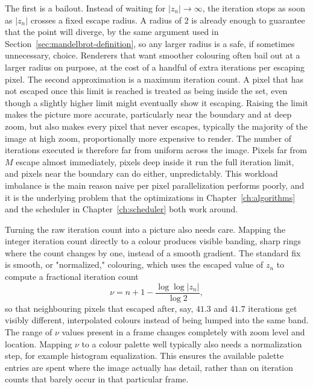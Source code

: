 \documentclass{ftndiplomski}
\begin{document}
The first is a bailout. Instead of waiting for $|z_n| \to \infty$, the iteration stops as soon as
$|z_n|$ crosses a fixed escape radius. A radius of $2$ is already enough to guarantee that the
point will diverge, by the same argument used in Section~\ref{sec:mandelbrot-definition}, so any
larger radius is a safe, if sometimes unnecessary, choice. Renderers that want smoother colouring
often bail out at a larger radius on purpose, at the cost of a handful of extra iterations per
escaping pixel. The second approximation is a maximum iteration count. A pixel that has not escaped
once this limit is reached is treated as being inside the set, even though a slightly higher limit
might eventually show it escaping. Raising the limit makes the picture more accurate, particularly
near the boundary and at deep zoom, but also makes every pixel that never escapes, typically the
majority of the image at high zoom, proportionally more expensive to render. The number of
iterations executed is therefore far from uniform across the image. Pixels far from $M$ escape
almost immediately, pixels deep inside it run the full iteration limit, and pixels near the
boundary can do either, unpredictably. This workload imbalance is the main reason naive per pixel
parallelization performs poorly, and it is the underlying problem that the optimizations in
Chapter~\ref{ch:algorithms} and the scheduler in Chapter~\ref{ch:scheduler} both work around.

Turning the raw iteration count into a picture also needs care. Mapping the integer iteration count
directly to a colour produces visible banding, sharp rings where the count changes by one, instead
of a smooth gradient. The standard fix is smooth, or "normalized," colouring, which uses the
escaped value of $z_n$ to compute a fractional iteration count
\begin{equation}
  \label{eq:smooth-coloring}
  \nu = n + 1 - \frac{\log \log |z_n|}{\log 2},
\end{equation}
so that neighbouring pixels that escaped after, say, $41.3$ and $41.7$ iterations get visibly
different, interpolated colours instead of being lumped into the same band. The range of
$\nu$ values present in a frame changes completely with zoom level and location. Mapping $\nu$ to a
colour palette well typically also needs a normalization step, for example histogram equalization.
This ensures the available palette entries are spent where the image actually has detail, rather
than on iteration counts that barely occur in that particular frame.
\end{document}
